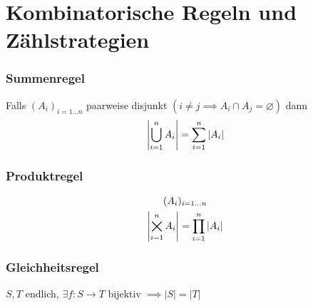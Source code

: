 \section{Kombinatorische Regeln und Zählstrategien}
\subsubsection{Summenregel}
Falls $(A_i)_{i=1 \dots n}$ paarweise disjunkt $(i \neq j \implies A_i \cap A_j = \varnothing )$ dann \\
\[ \abs{\bigcup_{i=1}^n A_i} = \sum_{i=1}^n \abs{A_i} \]

\subsubsection{Produktregel}
\begin{gather*}
	(A_i)_{i=1 \dots n} \\
	\abs{\bigtimes_{i=1}^n A_i} = \prod_{i=1}^n \abs{A_i}
\end{gather*}

\subsubsection{Gleichheitsregel}
$S, T$ endlich, $\exists f: S \rightarrow T$ bijektiv $\implies |S| = |T|$

